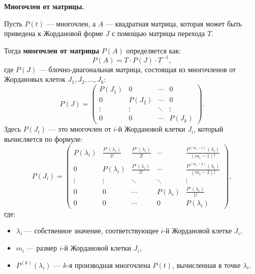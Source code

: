 \clearpage

\begin{shdef}
    \begin{definition}
        \textbf{Многочлен от матрицы.} 
        
        Пусть \( P(t) \) — многочлен, а \( A \) — квадратная матрица, которая может быть приведена к Жордановой форме \( J \) с помощью матрицы перехода \( T \).
        
        Тогда \textbf{многочлен от матрицы} \( P(A) \) определяется как:
        \[
        P(A) = T \cdot P(J) \cdot T^{-1},
        \]
        где \( P(J) \) — блочно-диагональная матрица, состоящая из многочленов от Жордановых клеток \( J_1, J_2, \ldots, J_k \):
        \[
        P(J) = 
        \begin{pmatrix}
        P(J_1) & 0 & \cdots & 0 \\
        0 & P(J_2) & \cdots & 0 \\
        \vdots & \vdots & \ddots & \vdots \\
        0 & 0 & \cdots & P(J_k)
        \end{pmatrix}.
        \]
        Здесь \( P(J_i) \) — это многочлен от \( i \)-й Жордановой клетки \( J_i \), который вычисляется по формуле:
        \[
        P(J_i) = 
        \begin{pmatrix}
        P(\lambda_i) & \frac{P'(\lambda_i)}{1!} & \frac{P''(\lambda_i)}{2!} & \cdots & \frac{P^{(m_i-1)}(\lambda_i)}{(m_i-1)!} \\
        0 & P(\lambda_i) & \frac{P'(\lambda_i)}{1!} & \cdots & \frac{P^{(m_i-2)}(\lambda_i)}{(m_i-2)!} \\
        \vdots & \vdots & \ddots & \ddots & \vdots \\
        0 & 0 & \cdots & P(\lambda_i) & \frac{P'(\lambda_i)}{1!} \\
        0 & 0 & \cdots & 0 & P(\lambda_i)
        \end{pmatrix},
        \]
        где:
        \begin{itemize}
            \item \( \lambda_i \) — собственное значение, соответствующее \( i \)-й Жордановой клетке \( J_i \),
            \item \( m_i \) — размер \( i \)-й Жордановой клетки \( J_i \),
            \item \( P^{(k)}(\lambda_i) \) — \( k \)-я производная многочлена \( P(t) \), вычисленная в точке \( \lambda_i \).
        \end{itemize}
    \end{definition}
\end{shdef}

